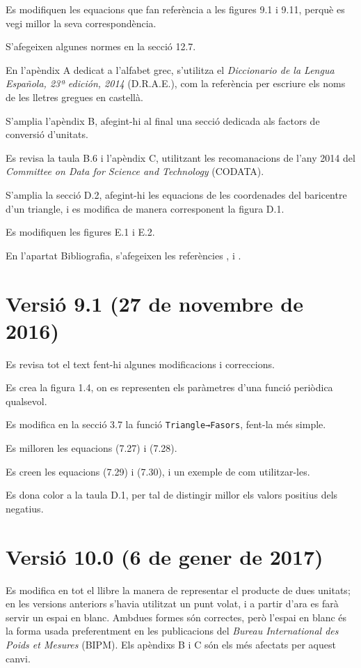 Es modifiquen les equacions que fan referència a les figures 9.1 i 9.11, perquè es vegi millor la seva correspondència.

S'afegeixen algunes normes en la secció 12.7.

En l'apèndix A dedicat a l'alfabet grec, s'utilitza el  
\textit{Diccionario de la Lengua Española, 23ª
edición, 2014} (D.R.A.E.), com la referència per escriure els noms de les lletres gregues en castellà.

S'amplia l'apèndix B, afegint-hi al final una secció dedicada als factors de conversió d'unitats.

Es revisa la taula B.6 i l'apèndix C, utilitzant les recomanacions de l'any 2014 del \textit{Committee on Data for Science and Technology} (CODATA).


S'amplia la secció D.2, afegint-hi les equacions de les coordenades del baricentre d'un triangle, i es modifica de manera corresponent la figura D.1.

Es modifiquen les figures E.1 i E.2.

En l'apartat Bibliografia, s'afegeixen les referències \cite{VOS}, \cite{WMF} i \cite{TRA}.


\section*{Versió 9.1 (27 de novembre de 2016)}

Es revisa tot el text fent-hi algunes  modificacions i correccions.

Es crea la figura 1.4, on es representen els paràmetres d'una funció periòdica qualsevol.

Es modifica en la secció 3.7 la funció \texttt{Triangle→Fasors}, fent-la més simple.

Es milloren les equacions (7.27) i (7.28).

Es creen les equacions (7.29) i (7.30), i un exemple de com utilitzar-les.

Es dona color a la taula D.1, per tal de distingir millor els valors positius dels negatius.

\section*{Versió 10.0 (6 de gener de 2017)}

Es modifica en tot el llibre la manera de representar el producte de dues unitats; en les versions anteriors s'havia utilitzat un punt volat, i a partir d'ara es farà servir un espai en blanc. Ambdues formes són correctes, però l'espai en blanc és la forma usada preferentment en les publicacions del  \textit{Bureau International des Poids et Mesures} (BIPM). Els apèndixs B i C són els més afectats per aquest canvi.

